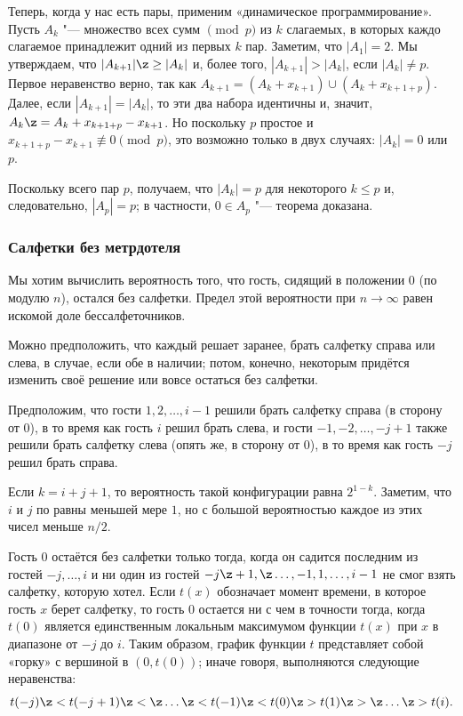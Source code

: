 \documentclass[twoside]{book}
\begin{document}
Теперь, когда у нас есть пары, применим «динамическое программирование».
Пусть $A_k$ "--- множество всех сумм $\pmod p$
из $k$ слагаемых, в которых каждо слагаемое принадлежит одний 
из первых $k$ пар.
Заметим, что $|A_1|= 2$.
Мы утверждаем, что
$|A_{k+1}|\z\ge|A_k|$ и, более того, $|A_{k+1}|>|A_k|$, если $|A_k|\ne
p$.
Первое неравенство верно, так как $A_{k+1} = (A_k+x_{k+1}) \cup
(A_k+x_{k+1+p})$.
Далее, если $|A_{k+1}|=|A_k|$, то эти два набора
идентичны и, значит, $A_k \z= A_k+x_{k+1+p}-x_{k+1}$.
Но поскольку
$p$ простое и $x_{k+1+p}-x_{k+1}\not\equiv 0\pmod p$, это возможно
только в двух случаях: $|A_k|= 0$ или $p$.

Поскольку всего пар $p$, получаем, что $|A_k|= p$ для некоторого $k
\le p$ и, следовательно, $|A_p|= p$; в частности, $0\in A_p$ "---
теорема доказана. \heart

\vspace{0pt minus 12pt}

\subsubsection*{Салфетки без метрдотеля}

Мы хотим вычислить вероятность того, что гость, сидящий в положении 0
(по модулю $n$), остался без салфетки.
Предел этой вероятности при
$n\to\infty$ равен искомой доле бессалфеточников.

Можно предположить, что каждый решает заранее, брать салфетку справа
или слева, в случае, если обе в наличии; потом, конечно, некоторым
придётся изменить своё решение или вовсе остаться без салфетки.

Предположим, что гости $1,2,\dots, i - 1$ решили брать салфетку справа
(в сторону от 0), в то время как гость $i$ решил брать слева, и гости
$-1,-2,\dots, -j + 1$ также решили брать салфетку слева (опять же, в
сторону от 0), в то время как гость $-j$ решил брать справа.

Если $k = i+j+1$, то вероятность такой конфигурации равна $2^{1-k}$.
Заметим, что $i$ и $j$ по равны меньшей мере $1$, но с большой
вероятностью каждое из этих чисел меньше $n/2$.

Гость $0$ остаётся без салфетки только тогда, когда он садится
последним из гостей $-j,\dots,i$ и ни один из гостей
$-j\z+1,\z\dots,-1,1,\dots,i-1$ не смог взять салфетку, которую хотел.
Если $t(x)$ обозначает момент времени, в которое гость $x$ берет
салфетку, то гость $0$ остается ни с чем в точности тогда, когда
$t(0)$ является единственным локальным максимумом функции $t(x)$ при
$x$ в диапазоне от $-j$ до $i$.
Таким образом, график функции $t$
представляет собой «горку» с вершиной в $(0,t(0))$; иначе говоря,
выполняются следующие неравенства:
\[t(-j)\z<t(-j+1) \z<\z\dots\z<t(-1)\z<t(0)\z>t(1)\z>\z\dots\z>t(i).\]
\end{document}

